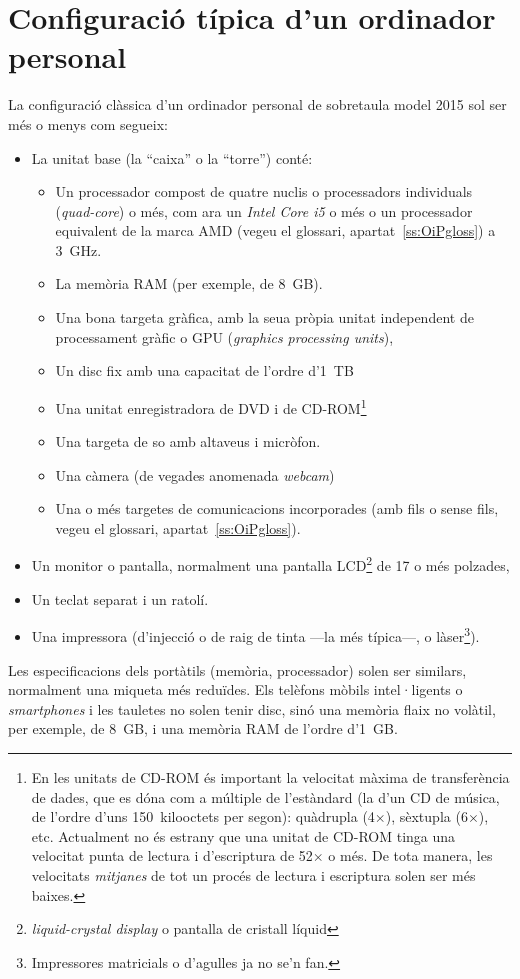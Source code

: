 \section{Configuració típica d'un ordinador personal}
La configuració clàssica d'un ordinador personal de sobretaula model
2015 sol ser més o menys com segueix:
\begin{itemize}
\item La unitat base (la ``caixa'' o la ``torre'') conté:
\begin{itemize}
\item Un processador compost de quatre nuclis o processadors
  individuals (\emph{quad-core}) o més, com ara un \emph{Intel Core
    i5} o més o un processador equivalent de la marca AMD (vegeu el
  glossari, apartat~\ref{ss:OiPgloss}) a 3~GHz.
\item La memòria RAM (per exemple, de 8~GB).
\item Una bona targeta gràfica, amb la seua pròpia unitat independent
  de processament gràfic o GPU (\emph{graphics processing units}),
\item Un disc fix amb una capacitat de l'ordre d'1~TB
\item Una unitat enregistradora de DVD i de CD-ROM\footnote{En les
    unitats de CD-ROM és important la velocitat màxima de
    transferència de dades, que es dóna com a múltiple de l'estàndard
    (la d'un CD de música, de l'ordre d'uns 150~kilooctets per segon):
    quàdrupla (4$\times$), sèxtupla (6$\times$), etc.  Actualment no
    és estrany que una unitat de CD-ROM tinga una velocitat punta de
    lectura i d'escriptura de 52$\times$ o més.  De tota manera, les
    velocitats \emph{mitjanes} de tot un procés de lectura i
    escriptura solen ser més baixes.}
\item Una targeta de so amb altaveus i micròfon.
\item Una càmera (de vegades anomenada \emph{webcam})
\item Una o més targetes de comunicacions incorporades (amb fils o
  sense fils, vegeu el glossari, apartat~\ref{ss:OiPgloss}).
\end{itemize}
\item Un monitor o pantalla, normalment una pantalla
  LCD\footnote{\emph{liquid-crystal display} o pantalla de cristall
    líquid} de 17 o més polzades,
\item Un teclat separat i un ratolí.
\item Una impressora (d'injecció o de raig de tinta ---la més
  típica---, o làser\footnote{Impressores matricials o d'agulles ja no
    se'n fan.}).
\end{itemize}
Les especificacions dels portàtils (memòria, processador) solen ser
similars, normalment una miqueta més reduïdes. Els telèfons mòbils
intel·ligents o \emph{smartphones} i les tauletes no solen tenir disc,
sinó una memòria flaix no volàtil, per exemple, de 8~GB, i una memòria
RAM de l'ordre d'1~GB.

